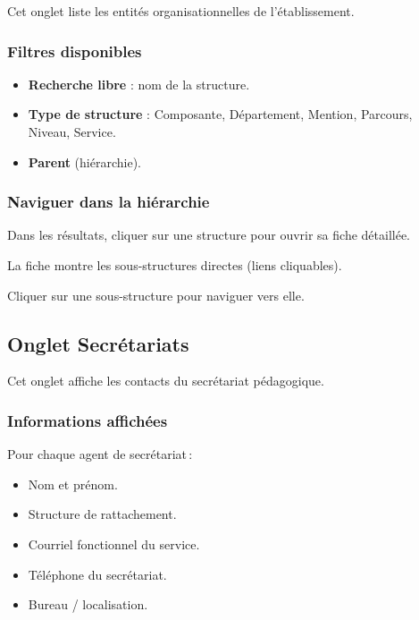 Cet onglet liste les entit\'es organisationnelles de l'\'etablissement.

\subsubsection{Filtres disponibles}

\begin{itemize}
  \item \textbf{Recherche libre} : nom de la structure.
  \item \textbf{Type de structure} : Composante, D\'epartement, Mention, Parcours, Niveau, Service.
  \item \textbf{Parent} (hi\'erarchie).
\end{itemize}

\subsubsection{Naviguer dans la hi\'erarchie}

\begin{steps}
  \item Dans les r\'esultats, cliquer sur une structure pour ouvrir sa fiche d\'etaill\'ee.
  \item La fiche montre les sous-structures directes (liens cliquables).
  \item Cliquer sur une sous-structure pour naviguer vers elle.
\end{steps}


\subsection{Onglet Secr\'etariats}

Cet onglet affiche les contacts du secr\'etariat p\'edagogique.

\subsubsection{Informations affich\'ees}

Pour chaque agent de secr\'etariat\,:
\begin{itemize}
  \item Nom et pr\'enom.
  \item Structure de rattachement.
  \item Courriel fonctionnel du service.
  \item T\'el\'ephone du secr\'etariat.
  \item Bureau / localisation.
\end{itemize}

